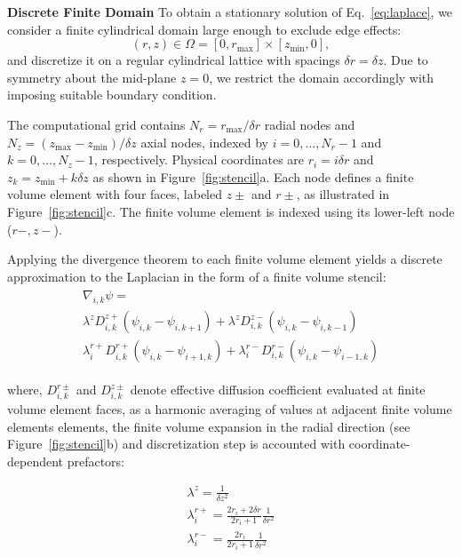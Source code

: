 \documentclass[10pt, a4paper]{article}
\begin{document}
\begin{multicols}{2}
\textbf{Discrete Finite Domain}
To obtain a stationary solution of Eq.~\eqref{eq:laplace}, we consider a finite cylindrical domain large enough to exclude edge effects:
\begin{equation*}
  (r,z) \in \Omega = [0,r_{\max}]\times[z_{\min},0],
\end{equation*}
and discretize it on a regular cylindrical lattice with spacings $\delta r=\delta z$. 
Due to symmetry about the mid-plane $z = 0$, we restrict the domain accordingly with imposing suitable boundary condition.

The computational grid contains $N_r=r_{\max}/\delta r$ radial nodes and $N_z=(z_{\max}-z_{\min})/\delta z$ axial nodes, indexed by $i=0,\dots,N_r-1$ and $k=0,\dots,N_z-1$, respectively.
Physical coordinates are $r_i=i\delta r$ and $z_k=z_{\min}+k\delta z$ as shown in Figure~\ref{fig:stencil}a.
Each node defines a finite volume element with four faces, labeled $z\pm$ and $r\pm$, as illustrated in Figure~\ref{fig:stencil}c.
The finite volume element is indexed using its lower-left node ($r-, z-$).

Applying the divergence theorem to each finite volume element yields a discrete approximation to the Laplacian in the form of a finite volume stencil:
\begin{eqnarray}
    \begin{aligned} 
        \nabla_{i,k} \psi = 
        \\
        \lambda^{z} D^{z+}_{i,k} (\psi_{i,k} - \psi_{i,k+1}) +  \lambda^{z} D^{z-}_{i,k} (\psi_{i,k} - \psi_{i,k-1})\\
        \lambda^{r+}_{i} D^{r+}_{i,k} (\psi_{i,k} - \psi_{i+1,k}) +  \lambda^{r-}_{i} D^{r-}_{i,k} (\psi_{i,k} - \psi_{i-1,k})
    \end{aligned}
    \label{eq:FV_divergence}
\end{eqnarray}

where, $D^{r\pm}_{i,k}$ and $D^{z\pm}_{i,k}$ denote effective diffusion coefficient evaluated at finite volume element faces, as a harmonic averaging of values at adjacent finite volume elements elements, 
the finite volume expansion in the radial direction (see Figure~\ref{fig:stencil}b) and discretization step is accounted with coordinate-dependent prefactors:

\begin{eqnarray}
    \lambda^{z} = \frac{1}{\delta z^2}\\
    \lambda^{r+}_{i} = \frac{2 r_i + 2 \delta r}{2 r_i + 1} \frac {1}{\delta r^2}\\
    \lambda^{r-}_{i} = \frac{2 r_i}{2 r_i + 1} \frac {1}{\delta r^2}
\end{eqnarray}


\end{multicols}
\end{document}
